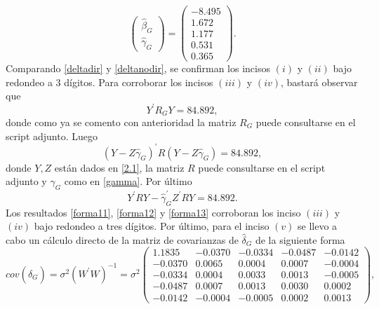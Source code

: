 \documentclass[10.5pt,notitlepage]{article}
\theoremstyle{plain}
\begin{document}
\begin{equation}\label{deltanodir}
    \begin{pmatrix}\hat{\beta}_{G} \\ \hat{\gamma}_{G} \end{pmatrix} =  \begin{pmatrix} -8.495\\1.672\\ 1.177\\ 0.531\\ 0.365 \end{pmatrix}.
\end{equation}
Comparando \eqref{deltadir} y \eqref{deltanodir}, se confirman los incisos \((i)\) y \((ii)\) bajo redondeo a 3 dígitos. 
Para corroborar los incisos \((iii)\) y \((iv)\), bastará observar que 
\begin{equation}\label{forma11}
    Y^{'}R_{G}Y = 84.892, 
\end{equation}
donde como ya se comento con anterioridad la matriz \(R_G\) puede consultarse en el script adjunto. Luego
\begin{equation}\label{forma12}
    (Y - Z \hat{\gamma}_{G})^{'}R(Y - Z \hat{\gamma}_{G}) = 84.892, 
\end{equation}
donde \(Y,Z\) están dados en \eqref{2.1}, la matriz \(R\) puede consultarse en el script adjunto y \(\gamma_{G}\) como en \eqref{gamma}. Por último
\begin{equation}\label{forma13}
     Y^{'}RY - \hat{\gamma}_{G}^{'}Z^{'}RY = 84.892. 
\end{equation}
Los resultados \eqref{forma11}, \eqref{forma12} y \eqref{forma13} corroboran los inciso \((iii)\) y \((iv)\) bajo redondeo a tres dígitos. Por último, para el inciso \((v)\) se llevo a cabo un cálculo directo de la matriz de covarianzas de \(\hat{\delta}_{G}\) de la siguiente forma 
\begin{equation}\label{covas1}
    cov(\hat{\delta}_{G}) = \sigma^2(W^{'}W)^{-1} = 
\sigma^2\begin{pmatrix}
  1.1835 & -0.0370 &  -0.0334 &  -0.0487 &  -0.0142\\
 -0.0370 &  0.0065 &   0.0004 &   0.0007 &  -0.0004\\
 -0.0334 &  0.0004 &   0.0033 &   0.0013 &  -0.0005\\
 -0.0487 &  0.0007 &   0.0013 &   0.0030 &   0.0002\\
 -0.0142 & -0.0004 &  -0.0005 &   0.0002 &   0.0013
\end{pmatrix},
\end{equation}
\end{document}
